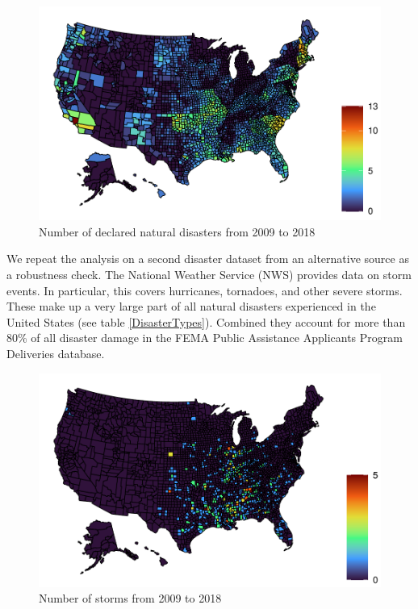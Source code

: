 \begin{figure}[!h]
	\centering
	\includegraphics[scale=1]{"../Code & Data/DisasterMap.pdf"}
	\caption{Number of declared natural disasters from 2009 to 2018}
	\label{DisasterMap}
\end{figure}



We repeat the analysis on a second disaster dataset from an alternative source as a robustness check. The National Weather Service (NWS) provides data on storm events. In particular, this covers hurricanes, tornadoes, and other severe storms. These make up a very large part of all natural disasters experienced in the United States (see table \ref{DisasterTypes}). Combined they account for more than 80\% of all disaster damage in the FEMA Public Assistance Applicants Program Deliveries database.

\begin{figure}[!h]
	\centering
	\includegraphics[scale=1]{"../Code & Data/StormMap.pdf"}
	\caption{Number of storms from 2009 to 2018}
	\label{StormMap}
\end{figure}

